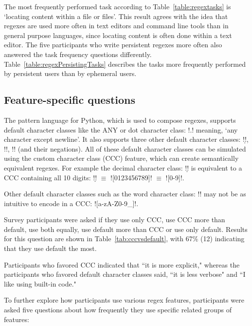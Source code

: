 The most frequently performed task according to Table~\ref{table:regextasks} is `locating content within a file or files'.  This result agrees with the idea that regexes are used more often in text editors and command line tools than in general purpose languages, since locating content is often done within a text editor.  The five participants who write persistent regexes more often also answered the task frequency questions differently.  Table~\ref{table:regexPersistingTasks} describes the tasks more frequently performed by persistent users than by ephemeral users.





\subsection{Feature-specific questions}
The pattern language for Python, which is used to compose regexes, supports default character classes like the ANY or dot character class: \cverb!.! meaning, `any character except newline'.
It also supports three other default character classes: \cverb!\d!, \cverb!\w!, \cverb!\s! (and their negations). All of these default character classes can be simulated using the custom character class (CCC) feature, which can create semantically equivalent regexes.
For example  the decimal character class: \cverb!\d! is equivalent to a CCC containing all 10 digits:  \cverb!\d! $\equiv$ \cverb![0123456789]! $\equiv$ \cverb![0-9]!.

Other default character classes such as the word character class: \cverb!\w! may not be as intuitive to encode in a CCC: \cverb![a-zA-Z0-9_]!.

Survey participants were asked if they use only CCC, use CCC more than default, use both equally, use default more than CCC or use only default.  Results for this question are shown in Table~\ref{tab:cccvsdefault}, with 67\% (12) indicating that they use default the most.

Participants who favored CCC indicated that ``it is more explicit," whereas the participants who favored default character classes said,  ``it is less verbose" and ``I like using built-in code."

To further explore how participants use various regex features, participants were asked five questions about how frequently they use specific related groups of features:

